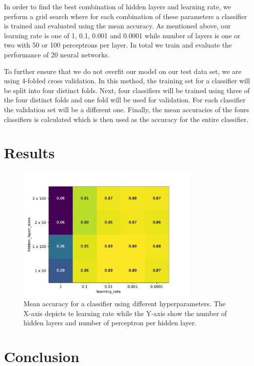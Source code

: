 \documentclass[sigconf]{acmart}
\begin{document}
In order to find the best combination of hidden layers and learning rate, we perform a grid search where for each combination of these parameters a classifier is trained and evaluated using the mean accuracy. As mentioned above, our learning rate is one of 1, 0.1, 0.001 and 0.0001 while number of layers is one or two with 50 or 100 perceptrons per layer. In total we train and evaluate the performance of 20 neural networks.

To further ensure that we do not overfit our model on our test data set, we are using 4-folded cross validation. In this method, the training set for a classifier will be split into four distinct folds. Next, four classifiers will be trained using three of the four distinct folds and one fold will be used for validation. For each classifier the validation set will be a different one. Finally, the mean accuracies of the fours classifiers is calculated which is then used as the accuracy for the entire classifier\cite{introduction_ml}.

\section{Results}

\begin{figure}
	\centering
	\label{fig:heatmap}
	\includegraphics[width=9cm]{fig2.pdf}
	\caption{Mean accuracy for a classifier using different hyperparameters. The X-axis depicts te learning rate while the Y-axis show the number of hidden layers and number of perceptron per hidden layer.}
\end{figure}

\section{Conclusion}



\end{document}
